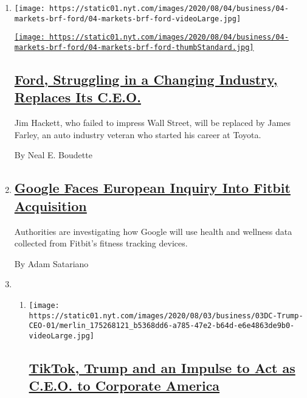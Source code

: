 \begin{enumerate}
\def\labelenumi{\arabic{enumi}.}
\item
  \texttt{[image: https://static01.nyt.com/images/2020/08/04/business/04-markets-brf-ford/04-markets-brf-ford-videoLarge.jpg]}

  \href{/2020/08/04/business/ford-jim-hackett-james-farley.html}{\texttt{[image: https://static01.nyt.com/images/2020/08/04/business/04-markets-brf-ford/04-markets-brf-ford-thumbStandard.jpg]}}

  \hypertarget{ford-struggling-in-a-changing-industry-replaces-its-ceo}{%
  \subsection{\texorpdfstring{\href{/2020/08/04/business/ford-jim-hackett-james-farley.html}{Ford,
  Struggling in a Changing Industry, Replaces Its
  C.E.O.}}{Ford, Struggling in a Changing Industry, Replaces Its C.E.O.}}\label{ford-struggling-in-a-changing-industry-replaces-its-ceo}}

  Jim Hackett, who failed to impress Wall Street, will be replaced by
  James Farley, an auto industry veteran who started his career at
  Toyota.

  By Neal E. Boudette
\item
  \hypertarget{google-faces-european-inquiry-into-fitbit-acquisition}{%
  \subsection{\texorpdfstring{\href{/2020/08/04/business/google-fitbit-europe.html}{Google
  Faces European Inquiry Into Fitbit
  Acquisition}}{Google Faces European Inquiry Into Fitbit Acquisition}}\label{google-faces-european-inquiry-into-fitbit-acquisition}}

  Authorities are investigating how Google will use health and wellness
  data collected from Fitbit's fitness tracking devices.

  By Adam Satariano
\item
  \begin{enumerate}
  \def\labelenumii{\arabic{enumii}.}
  \item
    \texttt{[image: https://static01.nyt.com/images/2020/08/03/business/03DC-Trump-CEO-01/merlin\_175268121\_b5368dd6-a785-47e2-b64d-e6e4863de9b0-videoLarge.jpg]}

    \hypertarget{tiktok-trump-and-an-impulse-to-act-as-ceo-to-corporate-america}{%
    \subsection{\texorpdfstring{\href{/2020/08/03/business/economy/trump-tiktok-china-business.html}{TikTok,
    Trump and an Impulse to Act as C.E.O. to Corporate
    America}}{TikTok, Trump and an Impulse to Act as C.E.O. to Corporate America}}\label{tiktok-trump-and-an-impulse-to-act-as-ceo-to-corporate-america}}


\end{enumerate}
\end{enumerate}
